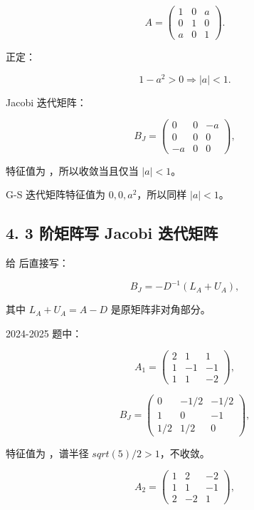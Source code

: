 \documentclass[11pt,a4paper]{ctexart}
\newcommand{\code}[1]{\begingroup\ttfamily\small #1\endgroup}
\begin{document}

\[
A=\begin{pmatrix}1&0&a\\0&1&0\\a&0&1\end{pmatrix}.
\]

正定：

\[
1-a^2>0 \Rightarrow |a|<1.
\]

Jacobi 迭代矩阵：

\[
B_J=
\begin{pmatrix}0&0&-a\\0&0&0\\-a&0&0\end{pmatrix},
\]

特征值为 \code{}，所以收敛当且仅当 $|a|<1$。

G-S 迭代矩阵特征值为 $0,0,a^2$，所以同样 $|a|<1$。


\subsection*{4. 3 阶矩阵写 Jacobi 迭代矩阵}


给 \code{} 后直接写：

\[
B_J=-D^{-1}(L_A+U_A),
\]

其中 $L_A+U_A=A-D$ 是原矩阵非对角部分。

2024-2025 题中：

\[
A_1=\begin{pmatrix}2&1&1\\1&-1&-1\\1&1&-2\end{pmatrix},
\]

\[
B_J=
\begin{pmatrix}
0&-1/2&-1/2\\
1&0&-1\\
1/2&1/2&0
\end{pmatrix},
\]

特征值为 \code{}，谱半径 $sqrt(5)/2>1$，不收敛。

\[
A_2=\begin{pmatrix}1&2&-2\\1&1&-1\\2&-2&1\end{pmatrix},
\]
\end{document}

